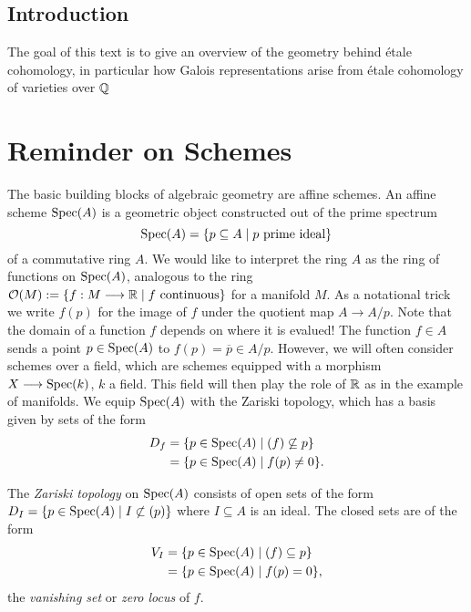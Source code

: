 \subsection{Introduction}
The goal of this text is to give an overview of the geometry behind \'etale cohomology, in particular how Galois representations arise from \'etale cohomology of varieties over $\mathbb{Q}$

\section{Reminder on Schemes}
The basic building blocks of algebraic geometry are affine schemes. An affine scheme $\operatorname{Spec}(A)$ is a geometric object constructed out of the prime spectrum 
\[
  \operatorname{Spec}(A) = \{p \subseteq A \mid p \text{ prime ideal}\}
\]
of a commutative ring $A$. We would like to interpret the ring $A$ as the ring of functions on $\operatorname{Spec}(A)$, analogous to the ring 
$\mathcal{O}(M) := \{f: M \longrightarrow \mathbb{R} \mid f \text{ continuous}\}$
 for a manifold $M$. As a notational trick we write $f(p)$ for the image of $f$ under the quotient map $A \to A/p$. Note that the domain of a function $f$ depends on where it is evalued! The function $f \in A$ sends a point $p \in \operatorname{Spec}(A)$ to $f(p) = \overline{p} \in A/p$.  However, we will often consider schemes over a field, which are schemes equipped with a morphism $X \longrightarrow \operatorname{Spec}(k)$, $k$ a field. This field will then play the role of $\mathbb{R}$ as in the example of manifolds. We equip $\operatorname{Spec}(A)$ with the Zariski topology, which has a basis given by sets of the form 
\begin{align*}
  D_f &= \{ p \in \operatorname{Spec}(A) \mid (f) \not \subseteq p \} \\
      &= \{ p \in \operatorname{Spec}(A) \mid f(p) \neq 0\} .
\end{align*}
\begin{definition}
    The \textit{Zariski topology} on $\operatorname{Spec}(A)$ consists of open sets of the form $D_I = \{ p \in \operatorname{Spec}(A) \mid I \not \subset (p)\}$ where $I \subseteq A$ is an ideal. The closed sets are of the form
    \begin{align*}
        V_I &= \{ p \in \operatorname{Spec}(A) \mid (f) \subseteq p \} \\
            &= \{ p \in \operatorname{Spec}(A) \mid f(p) = 0\},
    \end{align*}
    the \textit{vanishing set} or \textit{zero locus} of $f$. 
\end{definition}

